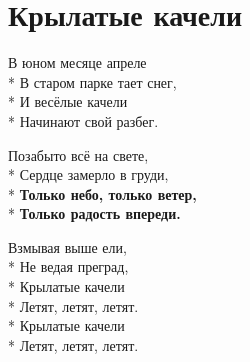 \vspace{\fill}\newpage

\section{Крылатые качели}
\label{song:Крылатые_качели}

\medskip

\begin{minipage}{\linewidth}
В юном месяце апреле\\*
В старом парке тает снег,\\*
И весёлые качели\\*
Начинают свой разбег.\\
\end{minipage}\par\medskip\nobreak

\medskip

\begin{minipage}{\linewidth}
Позабыто всё на свете,\\*
Сердце замерло в груди,\\*
\textbf{Только небо, только ветер,}\\*
\textbf{Только радость впереди.}\\
\end{minipage}\par\medskip\nobreak

\medskip

\begin{minipage}{\linewidth}
\hspace*{1.5em}Взмывая выше ели,\\*
\hspace*{1.5em}Не ведая преград,\\*
\hspace*{1.5em}Крылатые качели\\*
\hspace*{1.5em}Летят, летят, летят.\\*
\hspace*{1.5em}Крылатые качели\\*
\hspace*{1.5em}Летят, летят, летят.\\
\end{minipage}\par\medskip\nobreak

